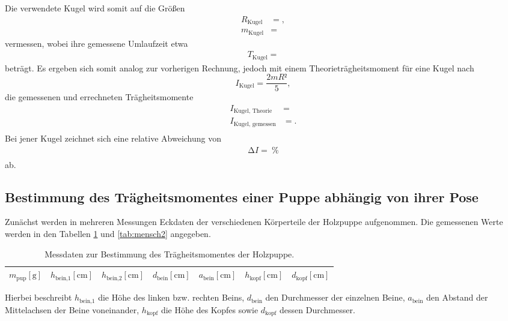 Die verwendete Kugel wird somit auf die Größen
\begin{align*}
  R_{\text{Kugel}} &= , \\
  m_{\text{Kugel}} &= 
\end{align*}
vermessen, wobei ihre gemessene Umlaufzeit etwa
\begin{align*}
  T_{\text{Kugel}} = 
\end{align*}
beträgt.
Es ergeben sich somit analog zur vorherigen Rechnung, jedoch mit einem Theorieträgheitsmoment für eine Kugel nach
\begin{equation}
  I_{\text{Kugel}} = \frac{2mR²}{5},
\end{equation}
die gemessenen und errechneten Trägheitsmomente
\begin{align*}
  I_{\text{Kugel, Theorie}}  &=  \\
  I_{\text{Kugel, gemessen}} &= . \\
\end{align*}
Bei jener Kugel zeichnet sich eine relative Abweichung von
\begin{align*}
  \increment I =  \:\si{\percent}\\
\end{align*}
ab.


\subsection{Bestimmung des Trägheitsmomentes einer Puppe abhängig von ihrer Pose}
Zunächst werden in mehreren Messungen Eckdaten der verschiedenen Körperteile der Holzpuppe aufgenommen.
Die gemessenen Werte werden in den Tabellen \ref{tab:mensch} und \ref{tab:mensch2} angegeben.

\begin{table}[H]
  \centering
  \caption{Messdaten zur Bestimmung des Trägheitsmomentes der Holzpuppe.}
  \label{tab:mensch}
  \begin{tabular}{c c c c c c c}
    \toprule
    {$m_\text{pup} [\si{\gram}]$} & {$h_\text{bein,1} [\si{\centi\metre}]$} & {$h_\text{bein,2} [\si{\centi\metre}]$} & {$d_\text{bein} [\si{\centi\metre}]$} & {$a_\text{bein} [\si{\centi\metre}]$} & {$h_\text{kopf} [\si{\centi\metre}]$} & {$d_\text{kopf} [\si{\centi\metre}]$}  \\
    \midrule
    
    \bottomrule
  \end{tabular}
\end{table}
Hierbei beschreibt $h_\text{bein,1}$ die Höhe des linken bzw. rechten Beins, $d_\text{bein}$ den Durchmesser der einzelnen Beine, $a_\text{bein}$ den Abstand der Mittelachsen der Beine voneinander, $h_\text{kopf}$ die Höhe des Kopfes sowie $d_\text{kopf}$ dessen Durchmesser.

